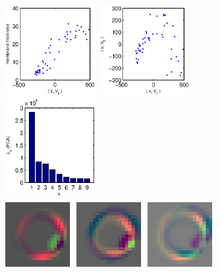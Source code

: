 \documentclass[12pt]{article}
\begin{document}
\begin{figure}
\includegraphics[width=4cm]{PCA_membrane_corr}
\includegraphics[width=4cm]{PCA_12}
\includegraphics[width=4cm]{evals}\\
\includegraphics[width=3cm]{eigenimage_1}
\includegraphics[width=3cm]{eigenimage_2}
\includegraphics[width=3cm]{eigenimage_3}

\end{figure}
\end{document}
